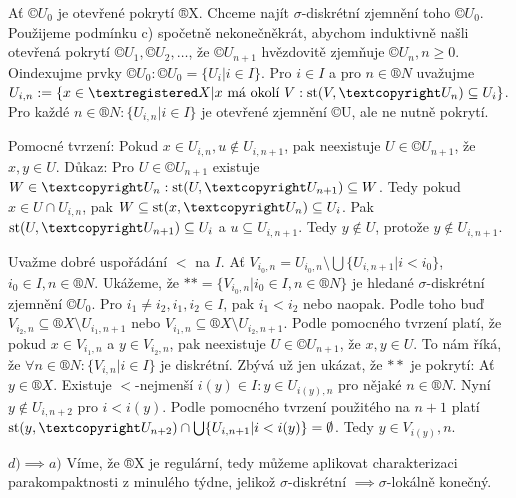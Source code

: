 \documentclass[12pt]{article}                   %
\begin{document}
\begin{veta}
\begin{dukazin}
                Ať $©U_0$ je otevřené pokrytí ®X. Chceme najít $\sigma$-diskrétní zjemnění toho $©U_0$. Použijeme podmínku c) spočetně nekonečněkrát, abychom induktivně našli otevřená pokrytí $©U_1, ©U_2, …$, že $©U_{n+1}$ hvězdovitě zjemňuje $©U_n, n≥0$. Oindexujme prvky $©U_0: ©U_0 = \{U_i|i \in I\}$. Pro $i \in I$ a pro $n \in ®N$ uvažujme $U_{i, n} := \{x \in ®X|x \text{ má okolí } V: \st(V, ©U_n) \subseteq U_i\}$. Pro každé $n \in ®N: \{U_{i, n}| i \in I\}$ je otevřené zjemnění ©U, ale ne nutně pokrytí.

                Pomocné tvrzení: Pokud $x \in U_{i, n}, u \notin U_{i, n+1}$, pak neexistuje $U \in ©U_{n+1}$, že $x, y \in U$. Důkaz: Pro $U \in ©U_{n+1}$ existuje $W \in ©U_n: \st(U, ©U_{n+1})\subseteq W$. Tedy pokud $x \in U\cap U_{i, n}$, pak $W \subseteq \st(x, ©U_n) \subseteq U_i$. Pak $\st(U, ©U_{n+1})\subseteq U_i$ a $u \subseteq U_{i, n+1}$. Tedy $y \notin U$, protože $y \notin U_{i, n+1}$.

                Uvažme dobré uspořádání $<$ na $I$. Ať $V_{i_0, n} = U_{i_0, n} \setminus \bigcup \{U_{i, n+1} | i < i_0\}$, $i_0 \in I, n \in ®N$. Ukážeme, že $** = \{V_{i_0, n} | i_0 \in I, n \in ®N\}$ je hledané $\sigma$-diskrétní zjemnění $©U_0$. Pro $i_1 ≠ i_2, i_1, i_2 \in I$, pak $i_1 < i_2$ nebo naopak. Podle toho buď $V_{i_2, n} \subseteq ®X \setminus U_{i_1, n+1}$ nebo $V_{i_1, n} \subseteq ®X \setminus U_{i_2, n+1}$. Podle pomocného tvrzení platí, že pokud $x \in V_{i_1, n}$ a $y \in V_{i_2, n}$, pak neexistuje $U \in ©U_{n+1}$, že $x, y \in U$. To nám říká, že $\forall n \in ®N: \{V_{i, n} | i \in I\}$ je diskrétní. Zbývá už jen ukázat, že $**$ je pokrytí: Ať $y \in ®X$. Existuje $<$-nejmenší $i(y) \in I: y \in U_{i(y), n}$ pro nějaké $n \in ®N$. Nyní $y \notin U_{i, n+2}$ pro $i <i(y)$. Podle pomocného tvrzení použitého na $n+1$ platí $\st(y, ©U_{n+2}) \cap \bigcup \{U_{i, n+1}|i < i(y)\} = \O$. Tedy $y \in V_{i(y)}, n$.

                $d) \implies a)$ Víme, že ®X je regulární, tedy můžeme aplikovat charakterizaci parakompaktnosti z minulého týdne, jelikož $\sigma$-diskrétní $\implies \sigma$-lokálně konečný.
        \end{dukazin}
    \end{veta}
\end{document}
